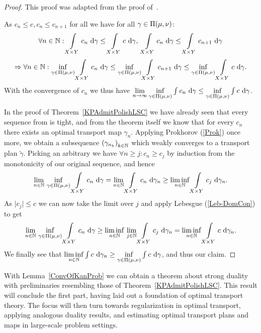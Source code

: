 \begin{proof}
	This proof was adapted from the proof of\ \cite[Lemma~1.41]{San2015}.

	As $c_n \le c, c_n \le c_{n + 1}$ for all \NinN{} we have for all $\gamma \in \TP{\mu}{\nu}$:
	\[ \forall \NinN: \int\limits_{X \times Y} c_n~\D[\gamma] \le \int\limits_{X \times Y} c~\D[\gamma],\ \int\limits_{X \times Y} c_n~\D[\gamma] \le \int\limits_{X \times Y} c_{n + 1}~\D[\gamma] \]
	\[ \Rightarrow \forall \NinN: \inf\limits_{\gamma \in \TP{\mu}{\nu}} \int\limits_{X \times Y} c_n~\D[\gamma] \le \inf\limits_{\gamma \in \TP{\mu}{\nu}} \int\limits_{X \times Y} c_{n + 1}~\D[\gamma] \le \inf\limits_{\gamma \in \TP{\mu}{\nu}} \int\limits_{X \times Y} c~\D[\gamma]. \]
	With the convergence of $c_n$ we thus have $\lim\limits_{\Ninf} \inf\limits_{\gamma \in \TP{\mu}{\nu}} \int c_n~\D[\gamma] \le \inf\limits_{\gamma \in \TP{\mu}{\nu}} \int c~\D[\gamma]$.

	In the proof of Theorem~\ref{KPAdmitPolishLSC} we have already seen that every sequence from \TP{\mu}{\nu} is tight, and from the theorem itself we know that for every $c_n$ there exists an optimal transport map $\gamma_n$. Applying Prokhorov (\ref{Prok}) once more, we obtain a subsequence ${(\gamma_{n_k})}_{\NinN[k]}$ which weakly converges to a transport plan $\tilde{\gamma}$. Picking an arbitrary \NinN[j] we have $\forall n \ge j: c_n \ge c_j$ by induction from the monotonicity of our original sequence, and hence
	\[ \lim\limits_{\NinN}\,\inf\limits_{\gamma \in \TP{\mu}{\nu}} \int\limits_{X \times Y} c_n~\D[\gamma] = \lim\limits_{\NinN} \int\limits_{X \times Y} c_n~\D[\gamma_n] \ge \liminf\limits_{\NinN} \int\limits_{X \times Y} c_j~\D[\gamma_n]. \]
	As $\vert c_j \vert \le c$ we can now take the limit over $j$ and apply Lebesgue (\ref{Leb-DomCon}) to get
	\[ \lim\limits_{\NinN}\,\inf\limits_{\gamma \in \TP{\mu}{\nu}} \int\limits_{X \times Y} c_n~\D[\gamma] \ge \liminf\limits_{\NinN}\,\lim\limits_{\NinN[j]} \int\limits_{X \times Y} c_j~\D[\gamma_n] = \liminf\limits_{\NinN} \int\limits_{X \times Y} c~\D[\gamma_n]. \]
	We finally see that $\liminf\limits_{\NinN} \int c~\D[\gamma_n] \ge \inf\limits_{\gamma \in \TP{\mu}{\nu}} \int c~\D[\gamma]$, and thus our claim.
\end{proof}

With Lemma~\ref{ConvOfKanProb} we can obtain a theorem about strong duality with preliminaries resembling those of Theorem~\ref{KPAdmitPolishLSC}. This result will conclude the first part, having laid out a foundation of optimal transport theory. The focus will then turn towards regularization in optimal transport, applying analogous duality results, and estimating optimal transport plans and maps in large-scale problem settings.

